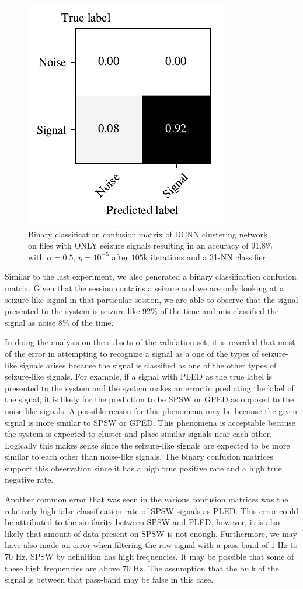\begin{figure}[!ht]
	\centering
	\includegraphics[width=0.425\linewidth]{pictures/conf_mat_exp_with_only_seizure_pooled.pdf}
	\caption[Binary confusion matrix on sessions with only seizure-like signals]{Binary classification confusion matrix of DCNN clustering network on files with ONLY seizure signals resulting in an accuracy of $91.8\%$ with $\alpha = 0.5$, $\eta = 10^{-5}$ after $105$k iterations and a 31-NN classifier}\label{fig:conf_mat_exp_with_only_seizure_pooled}  
\end{figure}

Similar to the last experiment, we also generated a binary classification confusion matrix. Given that the session contains a seizure and we are only looking at a seizure-like signal in that particular session, we are able to observe that the signal presented to the system is seizure-like 92\% of the time and mis-classified the signal as noise 8\% of the time. 

In doing the analysis on the subsets of the validation set, it is revealed that most of the error in attempting to recognize a signal as a one of the types of seizure-like signals arises because the signal is classified as one of the other types of seizure-like signals. For example, if a signal with PLED as the true label is presented to the system and the system makes an error in predicting the label of the signal, it is likely for the prediction to be SPSW or GPED as opposed to the noise-like signals. A possible reason for this phenomena may be because the given signal is more similar to SPSW or GPED. This phenomena is acceptable because the system is expected to cluster and place similar signals near each other. Logically this makes sense since the seizure-like signals are expected to be more similar to each other than noise-like signals. The binary confusion matrices support this observation since it has a high true positive rate and a high true negative rate. 

Another common error that was seen in the various confusion matrices was the relatively high false classification rate of SPSW signals as PLED. This error could be attributed to the similarity between SPSW and PLED, however, it is also likely that amount of data present on SPSW is not enough. Furthermore, we may have also made an error when filtering the raw signal with a pass-band of $1$ Hz to $70$ Hz. SPSW by definition has high frequencies. It may be possible that some of these high frequencies are above $70$ Hz. The assumption that the bulk of the signal is between that pass-band may be false in this case. 